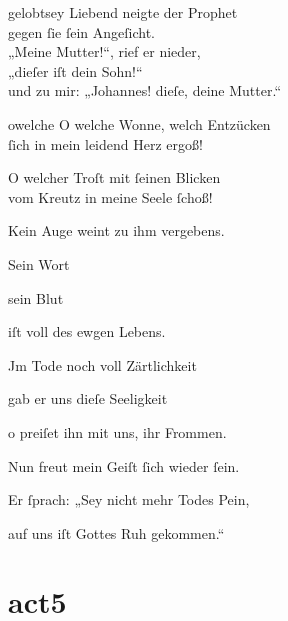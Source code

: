 \documentclass[abbrwidth=6em,tocstyle=ref-genre,toe=false]{ees}
\begin{document}
{\begin{movement}{gelobtsey}
  \voice[Johannes]
  Liebend neigte der Prophet\\
  gegen ſie ſein Angeſicht.\\
  „Meine Mutter!“, rief er nieder,\\
  „dieſer iſt dein Sohn!“\\
  und zu mir: „Johannes! dieſe, deine Mutter.“
\end{movement}

\begin{movement}{owelche}
  \voice[Maria]
  O welche Wonne, welch Entzücken\\
  ſich in mein leidend Herz ergoß!

  \voice[Johannes]
  O welcher Troſt mit ſeinen Blicken\\
  vom Kreutz in meine Seele ſchoß!

  Kein Auge weint zu ihm vergebens.

  \voice[Maria]
  Sein Wort

  \voice[Johannes]
  sein Blut

  \voice[alle]
  iſt voll des ewgen Lebens.

  \voice[Maria]
  Jm Tode noch voll Zärtlichkeit

  gab er uns dieſe Seeligkeit

  \voice[alle]
  o preiſet ihn mit uns, ihr Frommen.

  \voice[Maria]
  Nun freut mein Geiſt ſich wieder ſein.

  Er ſprach: „Sey nicht mehr Todes Pein,

  \voice[alle]
  auf uns iſt Gottes Ruh gekommen.“
\end{movement}

\part{act5}

}
\end{document}
